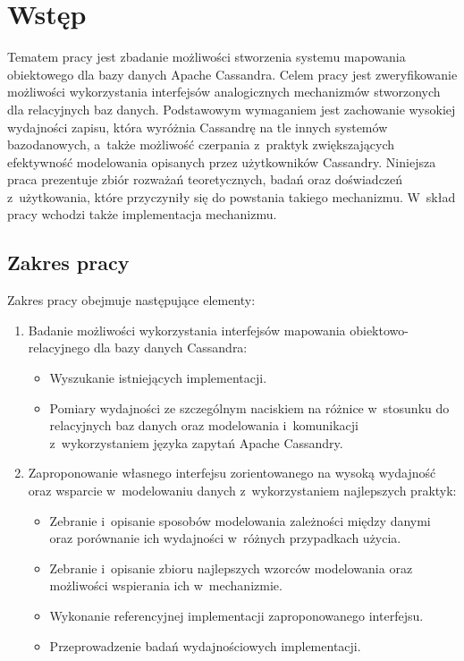 
\chapter{Wstęp}

Tematem pracy jest zbadanie możliwości stworzenia systemu mapowania obiektowego dla bazy danych Apache Cassandra. Celem pracy jest zweryfikowanie możliwości wykorzystania interfejsów analogicznych mechanizmów stworzonych dla relacyjnych baz danych. Podstawowym wymaganiem jest zachowanie wysokiej wydajności zapisu, która wyróżnia Cassandrę na tle innych systemów bazodanowych, a~także możliwość czerpania z~praktyk zwiększających efektywność modelowania opisanych przez użytkowników Cassandry. Niniejsza praca prezentuje zbiór rozważań teoretycznych, badań oraz doświadczeń z~użytkowania, które przyczyniły się do powstania takiego mechanizmu. W~skład pracy wchodzi także implementacja mechanizmu.

\section{Zakres pracy}

Zakres pracy obejmuje następujące elementy:

\begin{enumerate}
	\item Badanie możliwości wykorzystania interfejsów mapowania obiektowo-relacyjnego dla bazy danych Cassandra:
		\begin{itemize}
			\item Wyszukanie istniejących implementacji.
			\item Pomiary wydajności ze szczególnym naciskiem na różnice w~stosunku do relacyjnych baz danych oraz modelowania i~komunikacji z~wykorzystaniem języka zapytań Apache Cassandry.
		\end{itemize}
	\item Zaproponowanie własnego interfejsu zorientowanego na wysoką wydajność oraz wsparcie w~modelowaniu danych z~wykorzystaniem najlepszych praktyk:
		\begin{itemize}
			\item Zebranie i~opisanie sposobów modelowania zależności między danymi oraz porównanie ich wydajności w~różnych przypadkach użycia.
			\item Zebranie i~opisanie zbioru najlepszych wzorców modelowania oraz możliwości wspierania ich w~mechanizmie.
			\item Wykonanie referencyjnej implementacji zaproponowanego interfejsu.
			\item Przeprowadzenie badań wydajnościowych implementacji.
		\end{itemize}
\end{enumerate}

